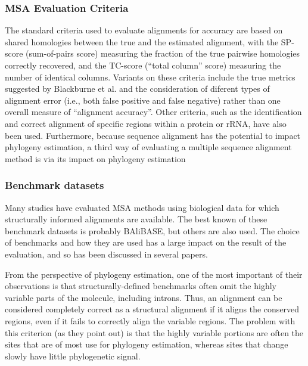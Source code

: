\subsubsection{MSA Evaluation Criteria}
The standard criteria used to evaluate alignments for
accuracy are based on shared homologies between the true and the estimated alignment,
with the SP-score (sum-of-pairs score) measuring the fraction of the true pairwise
homologies correctly recovered, and the TC-score (``total column'' score) measuring the
number of identical columns. Variants on these criteria include the true metrics suggested
by Blackburne et al. and the consideration of diferent types of alignment error (i.e.,
both false positive and false negative) rather than one overall measure of ``alignment
accuracy''. Other criteria, such as the identification and correct alignment of specific
regions within a protein or rRNA, have also been used. Furthermore, because
sequence alignment has the potential to impact phylogeny estimation, a third way of
evaluating a multiple sequence alignment method is via its impact on phylogeny estimation

\subsubsection{Benchmark datasets}
Many studies have
evaluated MSA methods using biological data for which structurally informed alignments
are available. The best known of these benchmark datasets is probably BAliBASE,
but others are also used. The choice of benchmarks and how they are used
has a large impact on the result of the evaluation, and so has been discussed in several
papers.

From the perspective of phylogeny estimation, one of the
most important of their observations is that structurally-defined benchmarks often omit
the highly variable parts of the molecule, including introns. Thus, an alignment can be
considered completely correct as a structural alignment if it aligns the conserved regions,
even if it fails to correctly align the variable regions. The problem with this criterion (as
they point out) is that the highly variable portions are often the sites that are of most use
for phylogeny estimation, whereas sites that change slowly have little phylogenetic signal.

